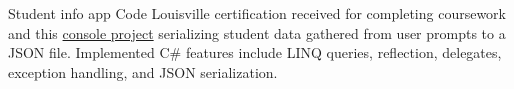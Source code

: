 {Student info app}
{}
{Code Louisville certification received for completing coursework and this \href{https://github.com/jacobarchambault/jacobarchambault.codelou.exerciseproject}{console project} serializing student data gathered from user prompts to a JSON file. Implemented C\# features include LINQ queries, reflection, delegates, exception handling, and JSON serialization.}
